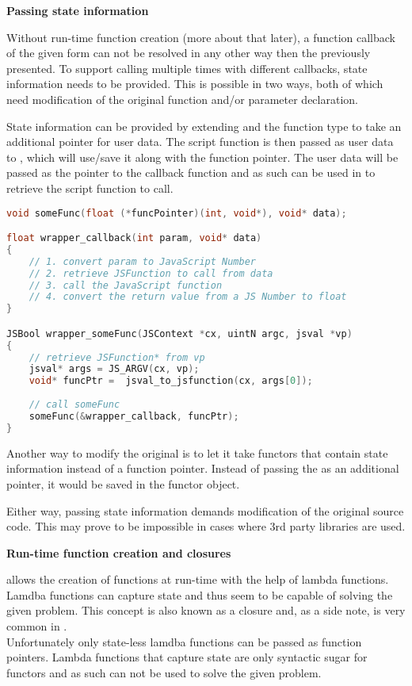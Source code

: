 \textbf{Passing state information}

Without run-time function creation (more about that later), a function callback of the given form can not be resolved in any other way then the previously presented. To support calling  multiple times with different callbacks, state information needs to be provided. This is possible in two ways, both of which need modification of the original function and/or parameter declaration.

State information can be provided by extending  and the function type to take an additional  pointer for user data. The script function is then passed as user data to , which will use/save it along with the function pointer. The user data will be passed as the  pointer to the  callback function and as such can be used in  to retrieve the script function to call.

\SingleSpacing
\begin{lstlisting}[language=C++, caption=Wrapper code for handling methods that take function pointers \#2]
void someFunc(float (*funcPointer)(int, void*), void* data);

float wrapper_callback(int param, void* data)
{
	// 1. convert param to JavaScript Number
	// 2. retrieve JSFunction to call from data
	// 3. call the JavaScript function
	// 4. convert the return value from a JS Number to float
}

JSBool wrapper_someFunc(JSContext *cx, uintN argc, jsval *vp)
{
	// retrieve JSFunction* from vp
	jsval* args = JS_ARGV(cx, vp);
	void* funcPtr =  jsval_to_jsfunction(cx, args[0]);
	
	// call someFunc
	someFunc(&wrapper_callback, funcPtr);
}
\end{lstlisting}
\OnehalfSpacing

Another way to modify the original  is to let it take functors that contain state information instead of a function pointer. Instead of passing the  as an additional  pointer, it would be saved in the functor object.

Either way, passing state information demands modification of the original source code. This may prove to be impossible in cases where 3rd party libraries are used.

\textbf{Run-time function creation and closures}

 allows the creation of functions at run-time with the help of lambda functions. Lamdba functions can capture state and thus seem to be capable of solving the given problem. This concept is also known as a closure and, as a side note, is very common in .
\\Unfortunately only state-less lamdba functions can be passed as function pointers. Lambda functions that capture state are only syntactic sugar for functors and as such can not be used to solve the given problem.

